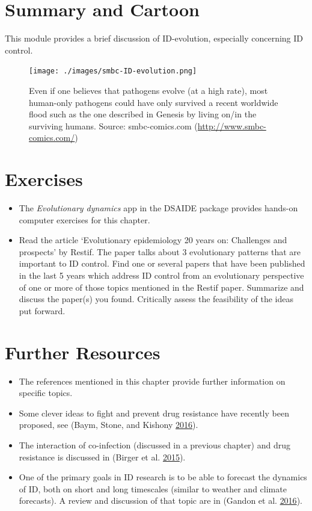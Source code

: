 \documentclass[
]{book}
\providecommand{\tightlist}{%
  \setlength{\itemsep}{0pt}\setlength{\parskip}{0pt}}
\begin{document}
\hypertarget{summary-and-cartoon-13}{%
\section{Summary and Cartoon}\label{summary-and-cartoon-13}}

This module provides a brief discussion of ID-evolution, especially concerning ID control.

\begin{figure}
\centering
\texttt{[image: ./images/smbc-ID-evolution.png]}
\caption{Even if one believes that pathogens evolve (at a high rate), most human-only pathogens could have only survived a recent worldwide flood such as the one described in Genesis by living on/in the surviving humans. Source: smbc-comics.com (\url{http://www.smbc-comics.com/})}
\end{figure}

\hypertarget{exercises-13}{%
\section{Exercises}\label{exercises-13}}

\begin{itemize}
\tightlist
\item
  The \emph{Evolutionary dynamics} app in the DSAIDE package provides hands-on computer exercises for this chapter.
\item
  Read the article `Evolutionary epidemiology 20 years on: Challenges and prospects' by Restif. The paper talks about 3 evolutionary patterns that are important to ID control. Find one or several papers that have been published in the last 5 years which address ID control from an evolutionary perspective of one or more of those topics mentioned in the Restif paper. Summarize and discuss the paper(s) you found. Critically assess the feasibility of the ideas put forward.
\end{itemize}

\hypertarget{further-resources-13}{%
\section{Further Resources}\label{further-resources-13}}

\begin{itemize}
\tightlist
\item
  The references mentioned in this chapter provide further information on specific topics.
\item
  Some clever ideas to fight and prevent drug resistance have recently been proposed, see (Baym, Stone, and Kishony \protect\hyperlink{ref-baym16}{2016}).
\item
  The interaction of co-infection (discussed in a previous chapter) and drug resistance is discussed in (Birger et al. \protect\hyperlink{ref-birger15}{2015}).
\item
  One of the primary goals in ID research is to be able to forecast the dynamics of ID, both on short and long timescales (similar to weather and climate forecasts). A review and discussion of that topic are in (Gandon et al. \protect\hyperlink{ref-gandon16}{2016}).
\end{itemize}
\end{document}

